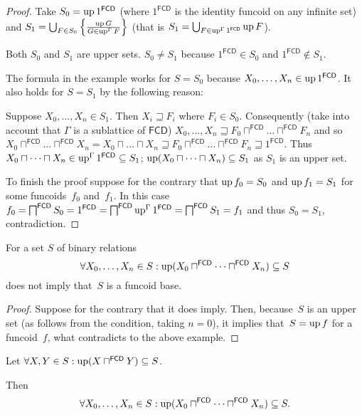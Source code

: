 \begin{proof}
Take $S_0 = \operatorname{up} 1^{\mathsf{FCD}}$ (where $1^{\mathsf{FCD}}$ is the identity funcoid on any infinite set)
and $S_1 = \bigcup_{F\in S_0} \left\{ \frac{\operatorname{up} G}{G\in\operatorname{up}^{\Gamma} F}\right\}$ (that is
$S_1 = \bigcup_{F\in\operatorname{up}^{\Gamma} 1^{\mathsf{FCD}}}\operatorname{up} F$).

Both $S_0$ and $S_1$ are upper sets. $S_0\ne S_1$ because $1^{\mathsf{FCD}}\in S_0$ and $1^{\mathsf{FCD}}\notin S_1$.

The formula in the example works for $S=S_0$ because $X_0,\dots,X_n\in \operatorname{up} 1^{\mathsf{FCD}}$. It also holds for $S=S_1$ by the
following reason:

Suppose $X_0,\dots,X_n\in S_1$. Then $X_i\sqsupseteq F_i$ where $F_i\in S_0$.
Consequently (take into account that $\Gamma$ is a sublattice of $\mathsf{FCD}$)
$X_0,\dots,X_n \sqsupseteq F_0\sqcap^{\mathsf{FCD}}\dots\sqcap^{\mathsf{FCD}} F_n$ and so
$X_0\sqcap^{\mathsf{FCD}}\dots\sqcap^{\mathsf{FCD}} X_n=
X_0\sqcap\dots\sqcap X_n \sqsupseteq F_0\sqcap^{\mathsf{FCD}}\dots\sqcap^{\mathsf{FCD}} F_n \sqsupseteq 1^{\mathsf{FCD}}$.
Thus $X_0\sqcap\dots\sqcap X_n \in \operatorname{up}^{\Gamma} 1^{\mathsf{FCD}} \subseteq S_1$;
$\operatorname{up}(X_0\sqcap\dots\sqcap X_n)\subseteq S_1$ as $S_1$ is an upper set.

To finish the proof suppose for the contrary that $\operatorname{up} f_0=S_0$ and $\operatorname{up} f_1=S_1$ for some funcoids~$f_0$ and~$f_1$.
In this case $f_0=\bigsqcap^{\mathsf{FCD}} S_0 = 1^{\mathsf{FCD}} = \bigsqcap^{\mathsf{FCD}} \operatorname{up}^{\Gamma} 1^{\mathsf{FCD}} =
\bigsqcap^{\mathsf{FCD}} S_1 = f_1$ and thus $S_0=S_1$, contradiction.
\end{proof}

\begin{prop}
For a set $S$ of binary relations
\[ \forall X_0,\dots,X_n\in S:\operatorname{up}(X_0\sqcap^{\mathsf{FCD}}\dots\sqcap^{\mathsf{FCD}} X_n)\subseteq S \]
does not imply that~$S$ is a funcoid base.
\end{prop}

\begin{proof}
Suppose for the contrary that it does imply. Then, because~$S$ is an upper set (as follows from the condition,
taking $n=0$), it implies that~$S=\operatorname{up} f$ for a funcoid~$f$, what contradicts to the above example.
\end{proof}

\begin{conjecture}
  Let $\forall X,Y\in S:\operatorname{up}(X\sqcap^{\mathsf{FCD}} Y)\subseteq S$.
  
  Then
  \[ \forall X_0,\dots,X_n\in S:\operatorname{up}(X_0\sqcap^{\mathsf{FCD}}\dots\sqcap^{\mathsf{FCD}} X_n)\subseteq S. \]
\end{conjecture}

